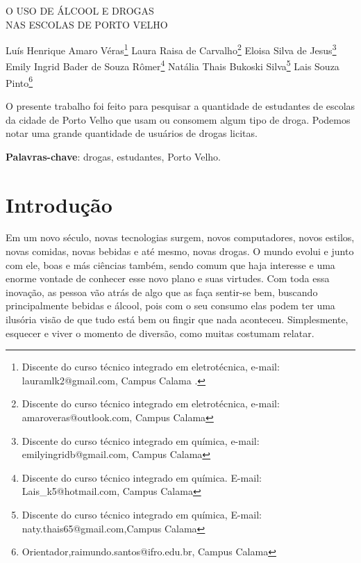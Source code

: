 \documentclass[article,12pt,onesidea,4paper,english,brazil]{abntex2}
\begin{document}
	
	
	\frenchspacing 
	
	\begin{center}
		\LARGE O USO DE ÁLCOOL E DROGAS \\NAS ESCOLAS DE PORTO VELHO
		
		\normalsize
	Luís Henrique Amaro Véras\footnote{Discente do curso técnico integrado em eletrotécnica, e-mail: lauramlk2@gmail.com, Campus Calama .} 
	Laura Raisa de Carvalho\footnote{Discente do curso técnico integrado em eletrotécnica, e-mail: amaroveras@outlook.com, Campus Calama } 
	Eloisa Silva de Jesus\footnote{Discente do curso técnico integrado em química, e-mail: emilyingridb@gmail.com, Campus Calama } \\
		Emily Ingrid Bader de Souza Rômer\footnote{Discente do curso técnico integrado em química. E-mail: Lais\_k5@hotmail.com, Campus Calama } 
	Natália Thais Bukoski Silva\footnote{Discente do curso técnico integrado em química, E-mail: naty.thais65@gmail.com,Campus Calama } 
	Lais Souza Pinto\footnote{Orientador,raimundo.santos@ifro.edu.br, Campus Calama} 
	\end{center}
	
	\begin{resumoumacoluna}
		O presente trabalho foi feito para pesquisar a quantidade de estudantes  de escolas da cidade de Porto Velho que usam ou consomem algum tipo de droga. Podemos notar uma grande quantidade de usuários de drogas licitas.
		
		\vspace{\onelineskip}
		
		\noindent
		\textbf{Palavras-chave}: drogas, estudantes, Porto Velho.
	\end{resumoumacoluna}
	
	\section*{Introdução}
	
Em um novo século, novas tecnologias surgem, novos computadores, novos estilos, novas comidas, novas bebidas e até mesmo, novas drogas. O mundo evolui e junto com ele, boas e más ciências também, sendo comum que haja interesse e uma enorme vontade de conhecer esse novo plano e suas virtudes. Com toda essa inovação, as pessoa vão atrás de algo que as faça sentir-se bem, buscando principalmente bebidas e álcool, pois com o seu consumo elas podem ter uma ilusória visão de que tudo está bem ou fingir que nada aconteceu. Simplesmente, esquecer e viver o momento de diversão, como muitas costumam relatar.
\end{document}
